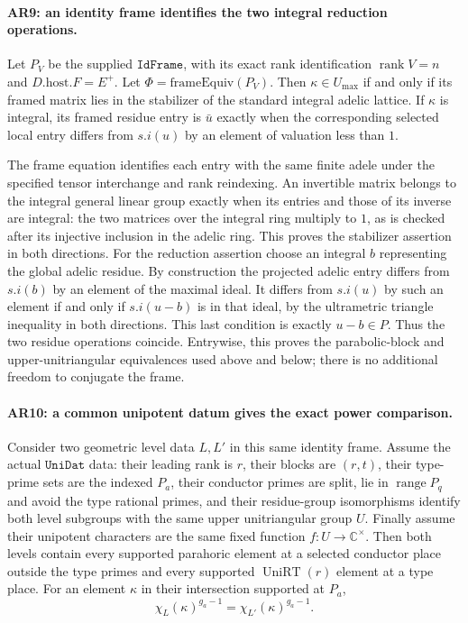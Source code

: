 \paragraph{AR9: an identity frame identifies the two integral reduction operations.}
Let $P_V$ be the supplied $\texttt{IdFrame}$, with its exact rank
identification $\operatorname{rank}V=n$ and $D.\mathrm{host}.F=E^+$.
Let $\Phi=\mathrm{frameEquiv}(P_V)$. Then
$\kappa\in U_{\max}$ if and only if its framed matrix lies in the
stabilizer of the standard integral adelic lattice. If $\kappa$ is
integral, its framed residue entry is $\bar u$ exactly when the
corresponding selected local entry differs from $s.i(u)$ by an
element of valuation less than $1$.

The frame equation identifies each entry with the same finite adele
under the specified tensor interchange and rank reindexing. An
invertible matrix belongs to the integral general linear group
exactly when its entries and those of its inverse are integral:
the two matrices over the integral ring multiply to $1$, as is
checked after its injective inclusion in the adelic ring. This proves
the stabilizer assertion in both directions.
For the reduction assertion choose an integral $b$ representing the
global adelic residue. By construction the projected adelic entry
differs from $s.i(b)$ by an element of the maximal ideal. It differs
from $s.i(u)$ by such an element if and only if
$s.i(u-b)$ is in that ideal, by the ultrametric triangle inequality
in both directions. This last condition is exactly $u-b\in P$.
Thus the two residue operations coincide. Entrywise, this proves
the parabolic-block and upper-unitriangular equivalences used above
and below; there is no additional freedom to conjugate the frame.

\paragraph{AR10: a common unipotent datum gives the exact power comparison.}
Consider two geometric level data $L,L'$ in this same identity frame.
Assume the actual $\texttt{UniDat}$ data: their leading rank is $r$,
their blocks are $(r,t)$, their type-prime sets are the indexed $P_a$,
their conductor primes are split, lie in $\operatorname{range}P_q$
and avoid the type rational primes, and their residue-group
isomorphisms identify both level subgroups with the same upper
unitriangular group $U$. Finally assume their unipotent characters
are the same fixed function $f:U\to\mathbb C^\times$.
Then both levels contain every supported parahoric element at a
selected conductor place outside the type primes and every supported
$\operatorname{UniRT}(r)$ element at a type place. For an element
$\kappa$ in their intersection supported at $P_a$,
\[
 \chi_L(\kappa)^{g_a-1}
       =\chi_{L'}(\kappa)^{g_a-1}.                       \tag{AR.11}
\]

